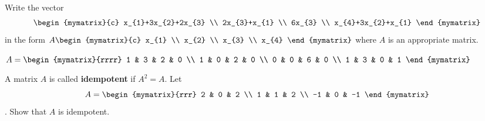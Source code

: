 \begin{enumialphparenastyle}
\begin{ex} Write the vector
  \begin{equation*}
    \begin{mymatrix}{c}
      x_{1}+3x_{2}+2x_{3} \\
      2x_{3}+x_{1} \\
      6x_{3} \\
      x_{4}+3x_{2}+x_{1}
    \end{mymatrix}
  \end{equation*}
  in the form $A\begin{mymatrix}{c}
    x_{1} \\
    x_{2} \\
    x_{3} \\
    x_{4}
  \end{mymatrix} $ where $A$ is an appropriate matrix.
  \begin{sol}
    $A=\begin{mymatrix}{rrrr}
      1 & 3 & 2 & 0 \\
      1 & 0 & 2 & 0 \\
      0 & 0 & 6 & 0 \\
      1 & 3 & 0 & 1
    \end{mymatrix}$
  \end{sol}
\end{ex}

\begin{ex} A matrix $A$ is called \textbf{idempotent}%
   if $A^{2}=A$. 
  Let
  \begin{equation*}
    A=
    \begin{mymatrix}{rrr}
      2 & 0 & 2 \\
      1 & 1 & 2 \\
      -1 & 0 & -1
    \end{mymatrix}
  \end{equation*}.
  Show that $A$ is idempotent.
\end{ex}

\end{enumialphparenastyle}
